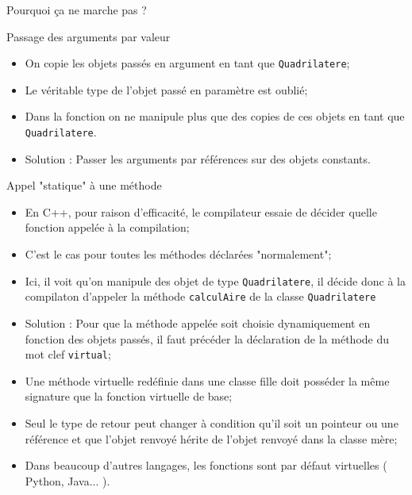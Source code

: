 \documentclass[compress,10pt,aspectratio=169]{beamer}
\begin{document}
\begin{frame}[fragile]{Pourquoi ça ne marche pas ?}
  \scriptsize
  \begin{block}{\small Passage des arguments par valeur}
  \begin{itemize}
  \item On copie les objets passés en argument en tant que \texttt{Quadrilatere};
  \item Le véritable type de l'objet passé en paramètre est oublié;
  \item Dans la fonction on ne manipule plus que des copies de ces objets en tant que \texttt{Quadrilatere}.
  \item {\color{blue}Solution} : Passer les arguments par références sur des objets constants.
  \end{itemize}
  \end{block}
  \vspace*{-4mm}
  \begin{block}{\small Appel "statique" à une méthode}
  \vspace*{-2mm}
  \begin{itemize}
  \item En C++, pour raison d'efficacité, le compilateur essaie de décider quelle fonction appelée à la compilation;
  \item C'est le cas pour toutes les méthodes déclarées "normalement";
  \item Ici, il voit qu'on manipule des objet de type \texttt{Quadrilatere}, il décide donc à la compilaton 
  d'appeler la méthode \texttt{calculAire} de la classe \texttt{Quadrilatere}
  \item {\color{blue}Solution} : Pour que la méthode appelée soit choisie dynamiquement en fonction des objets passés, il faut précéder la déclaration de la méthode du mot clef \texttt{virtual};
  \item Une méthode virtuelle redéfinie dans une classe fille doit posséder la même signature que la fonction virtuelle de base;
  \item Seul le type de retour peut changer à condition qu'il soit un pointeur ou une référence et que l'objet renvoyé hérite de l'objet renvoyé
  dans la classe mère;
  \item Dans beaucoup d'autres langages, les fonctions sont par défaut virtuelles ( Python, Java... ).
  \end{itemize}
  \end{block}
  \end{frame}
  
\end{document}
